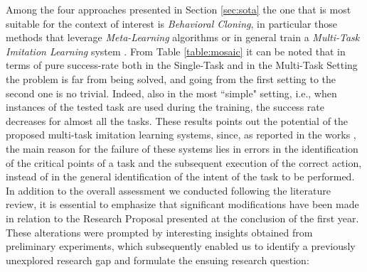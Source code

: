 Among the four approaches presented in Section \ref{sec:sota} the one that is most suitable for the context of interest is \textit{Behavioral Cloning}, in particular those methods that leverage \textit{Meta-Learning} algorithms \cite{finn2017one_shot_visual_il,yu2018one_shot_hil,yu2018daml} or in general train a \textit{Multi-Task Imitation Learning} system \cite{jang2022bc_z,mandi2022towards_more_generalizable_one_shot}. From Table \ref{table:mosaic} it can be noted that in terms of pure success-rate both in the Single-Task and in the Multi-Task Setting the problem is far from being solved, and going from the first setting to the second one is no trivial. Indeed, also in the most ``simple" setting, i.e., when instances of the tested task are used during the training, the success rate decreases for almost all the tasks. These results points out the potential of the proposed multi-task imitation learning systems, since, as reported in the works \cite{jang2022bc_z,yu2018daml}, the main reason for the failure of these systems lies in errors in the identification of the critical points of a task and the subsequent execution of the correct action, instead of in the general identification of the intent of the task to be performed.
In addition to the overall assessment we conducted following the literature review, it is essential to emphasize that significant modifications have been made in relation to the Research Proposal presented at the conclusion of the first year. These alterations were prompted by interesting insights obtained from preliminary experiments, which subsequently enabled us to identify a previously unexplored research gap and formulate the ensuing research question:
